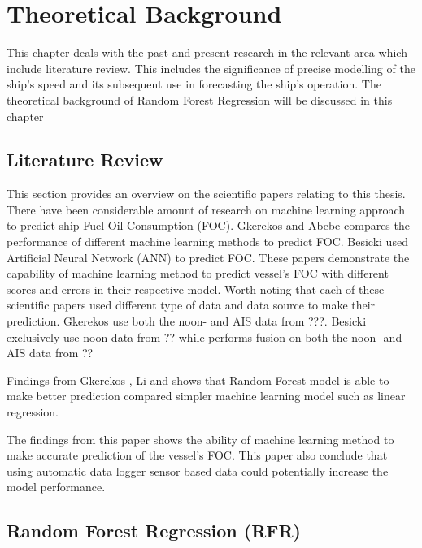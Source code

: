 \section{Theoretical Background} \label{theory}

This chapter deals with the past and present research in the relevant area which include literature review. This includes 
the significance of precise modelling of the ship's speed and its subsequent use in forecasting the ship's operation.
The theoretical background of Random Forest Regression will be discussed in this chapter 

\subsection{Literature Review}

This section provides an overview on the scientific papers relating to this thesis. There have been considerable amount of research on machine learning approach to predict ship Fuel Oil Consumption (FOC). Gkerekos \cite{Gkerekos.2019} and Abebe \cite{Abebe.2020} compares the performance of different machine learning methods to predict FOC. Besicki \cite{BalBesikci.2016} used Artificial Neural Network (ANN) to predict FOC. These papers demonstrate the capability of machine learning method to predict vessel's FOC with different scores and errors in their respective model. Worth noting that each of these scientific papers used different type of data and data source to make their prediction. Gkerekos \cite{Gkerekos.2019} use both the noon- and AIS data from ???. Besicki \cite{BalBesikci.2016} exclusively use noon data from ?? while \cite{Abebe.2020} performs fusion on both the noon- and AIS data from ??

Findings from Gkerekos \cite{Gkerekos.2019}, Li \cite{Li.2022} and \cite{Abebe.2020} shows that Random Forest model is able to make better prediction compared simpler machine learning model such as linear regression. 

The findings from this paper shows the ability of machine learning method to make accurate prediction of the vessel's FOC. This paper also conclude that using automatic data logger sensor based data could potentially increase the model performance. 
\subsection{Random Forest Regression (RFR)}



